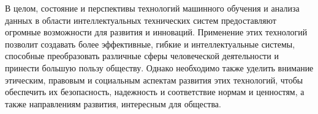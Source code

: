     В целом, состояние и перспективы технологий машинного обучения и анализа данных в области интеллектуальных технических систем предоставляют огромные возможности для развития и инноваций. Применение этих технологий позволит создавать более эффективные, гибкие и интеллектуальные системы, способные преобразовать различные сферы человеческой деятельности и принести большую пользу обществу. Однако необходимо также уделить внимание этическим, правовым и социальным аспектам развития этих технологий, чтобы обеспечить их безопасность, надежность и соответствие нормам и ценностям, а также направлениям развития, интересным для общества.
\endinput